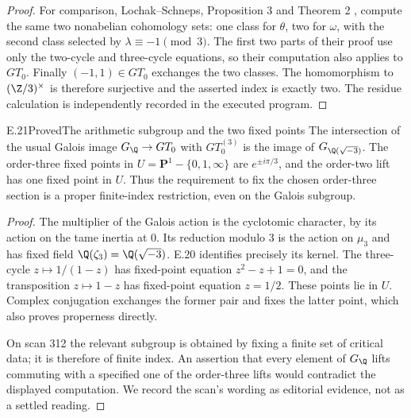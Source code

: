 \begin{proof}
For comparison, Lochak--Schneps, Proposition 3 and Theorem 2 \cite{R-LS}, compute the same two nonabelian cohomology sets: one class for $\theta$, two for $\omega$, with the second class selected by $\lambda\equiv-1\pmod3$. The first two parts of their proof use only the two-cycle and three-cycle equations, so their computation also applies to $GT_0$. Finally $(-1,1)\in GT_0$ exchanges the two classes. The homomorphism to $(\Z/3)^\times$ is therefore surjective and the asserted index is exactly two. The residue calculation is independently recorded in the executed program.
\end{proof}

\begin{claim}{E.21}{Proved}{The arithmetic subgroup and the two fixed points}
The intersection of the usual Galois image $G_{\Q}\to GT_0$ with $GT_0^{(3)}$ is the image of $G_{\Q(\sqrt{-3})}$. The order-three fixed points in $U=\mathbf P^1-\{0,1,\infty\}$ are $e^{\pm i\pi/3}$, and the order-two lift has one fixed point in $U$. Thus the requirement to fix the chosen order-three section is a proper finite-index restriction, even on the Galois subgroup.
\end{claim}
\begin{proof}
The multiplier of the Galois action is the cyclotomic character, by its action on the tame inertia at $0$. Its reduction modulo $3$ is the action on $\mu_3$ and has fixed field $\Q(\zeta_3)=\Q(\sqrt{-3})$. E.20 identifies precisely its kernel. The three-cycle $z\mapsto1/(1-z)$ has fixed-point equation $z^2-z+1=0$, and the transposition $z\mapsto1-z$ has fixed-point equation $z=1/2$. These points lie in $U$. Complex conjugation exchanges the former pair and fixes the latter point, which also proves properness directly.

On scan 312 the relevant subgroup is obtained by fixing a finite set of critical data; it is therefore of finite index. An assertion that every element of $G_\Q$ lifts commuting with a specified one of the order-three lifts would contradict the displayed computation. We record the scan's wording as editorial evidence, not as a settled reading.
\end{proof}


